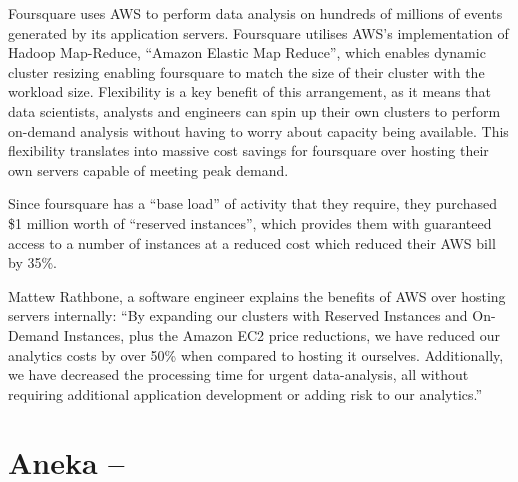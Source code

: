 Foursquare uses AWS to perform data analysis on hundreds of millions of events generated by its application servers.  Foursquare utilises AWS’s implementation of Hadoop Map-Reduce, ``Amazon Elastic Map Reduce'', which enables dynamic cluster resizing enabling foursquare to match the size of their cluster with the workload size.  Flexibility is a key benefit of this arrangement, as it means that data scientists, analysts and engineers can spin up their own clusters to perform on-demand analysis without having to worry about capacity being available.  This flexibility translates into massive cost savings for foursquare over hosting their own servers capable of meeting peak demand.

Since foursquare has a ``base load'' of activity that they require, they purchased \$1 million worth of ``reserved instances'', which provides them with guaranteed access to a number of instances at a reduced cost which reduced their AWS bill by 35\%.  

Mattew Rathbone, a software engineer explains the benefits of AWS over hosting servers internally: ``By expanding our clusters with Reserved Instances and On-Demand Instances, plus the Amazon EC2 price reductions, we have reduced our analytics costs by over 50\% when compared to hosting it ourselves. Additionally, we have decreased the processing time for urgent data-analysis, all without requiring additional application development or adding risk to our analytics.''\ftSAmTwo
\ftSAmTwoText

\section{Aneka -- }

